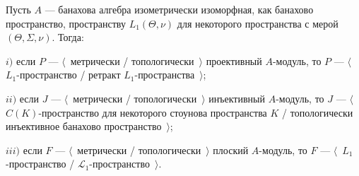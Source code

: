 \begin{proposition}\label{TopProjInjFlatModOverL1Charac} Пусть $A$ --- банахова алгебра изометрически изоморфная, как банахово пространство, пространству $L_1(\Theta,\nu)$ для некоторого пространства с мерой $(\Theta,\Sigma,\nu)$. Тогда:

$i)$ если $P$ --- $\langle$~метрически / топологически~$\rangle$ проективный $A$-модуль, то $P$ --- $\langle$~$L_1$-пространство / ретракт $L_1$-пространства~$\rangle$;

$ii)$ если $J$ --- $\langle$~метрически / топологически~$\rangle$ инъективный $A$-модуль, то $J$ --- $\langle$~$C(K)$-пространство для некоторого стоунова пространства $K$ / топологически инъективное банахово пространство~$\rangle$;

$iii)$ если $F$ --- $\langle$~метрически / топологически~$\rangle$ плоский $A$-модуль, то $F$ --- $\langle$~$L_1$-пространство / $\mathscr{L}_1$-пространство~$\rangle$.
\end{proposition}
